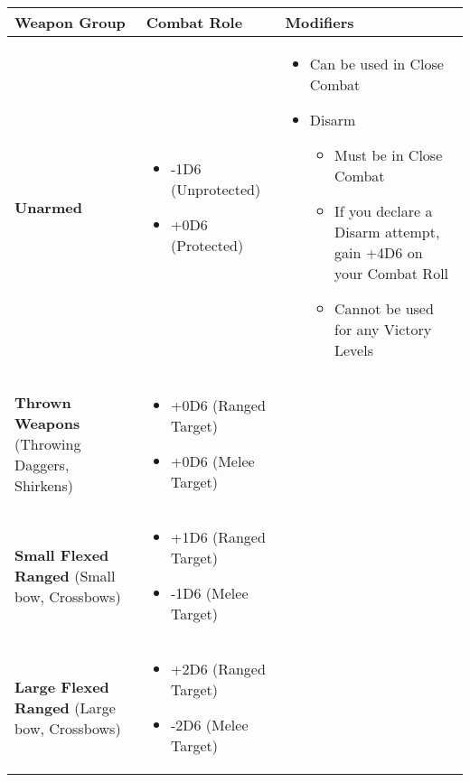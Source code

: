 \begin{center}
    \begin{xltabular}{\textwidth}{|p{.25\textwidth} p{.3\textwidth} p{.35\textwidth}|} 
        \hline
        \textbf{Weapon Group} & \textbf{Combat Role} & \textbf{Modifiers} \\
        \hline
        \raggedright\textbf{Unarmed} &
            \begin{itemize}
                \item -1D6 (Unprotected)
                \item +0D6 (Protected)
            \end{itemize} &
                \begin{itemize}
                    \item Can be used in Close Combat
                    \item Disarm
                    \begin{itemize}
                        \item Must be in Close Combat
                        \item If you declare a Disarm attempt, gain +4D6 on your Combat Roll
                        \item Cannot be used for any Victory Levels
                    \end{itemize}
                \end{itemize} \\
        \raggedright\textbf{Thrown Weapons} (Throwing Daggers, Shirkens) &
            \begin{itemize}
                \item +0D6 (Ranged Target)
                \item +0D6 (Melee Target)
            \end{itemize} & \\
        \raggedright\textbf{Small Flexed Ranged} (Small bow, Crossbows) &
            \begin{itemize}
                \item +1D6 (Ranged Target)
                \item -1D6 (Melee Target)
            \end{itemize} & \\
        \raggedright\textbf{Large Flexed Ranged} (Large bow, Crossbows) &
            \begin{itemize}
                \item +2D6 (Ranged Target)
                \item -2D6 (Melee Target)

\end{itemize}
\end{xltabular}
\end{center}
